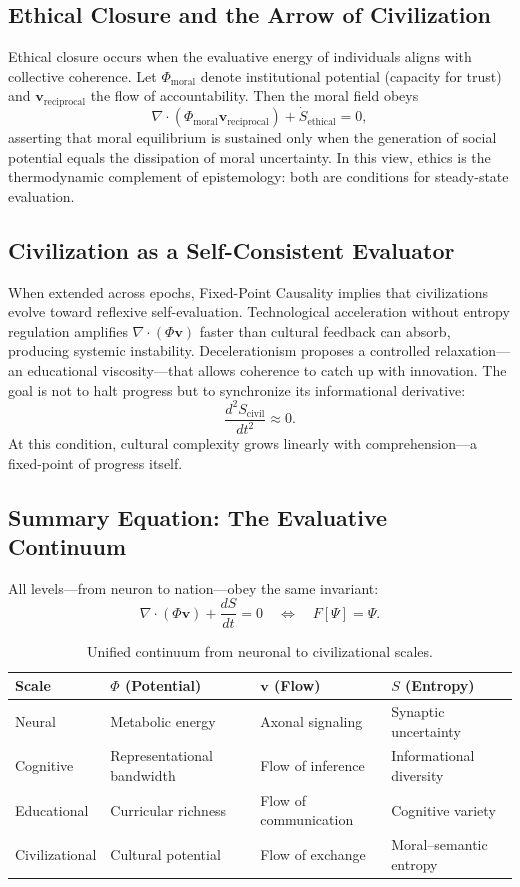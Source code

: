 \documentclass[12pt,a4paper]{article}
\begin{document}
\subsection{Ethical Closure and the Arrow of Civilization}

Ethical closure occurs when the evaluative energy of individuals aligns with collective coherence.
Let $\Phi_{\mathrm{moral}}$ denote institutional potential (capacity for trust) and $\mathbf{v}_{\mathrm{reciprocal}}$ the flow of accountability.
Then the moral field obeys
\[
\nabla\!\cdot(\Phi_{\mathrm{moral}}\mathbf{v}_{\mathrm{reciprocal}})+\dot S_{\mathrm{ethical}}=0,
\]
asserting that moral equilibrium is sustained only when the generation of social potential equals the dissipation of moral uncertainty.
In this view, ethics is the thermodynamic complement of epistemology: both are conditions for steady-state evaluation.

\subsection{Civilization as a Self-Consistent Evaluator}

When extended across epochs, Fixed-Point Causality implies that civilizations evolve toward reflexive self-evaluation.
Technological acceleration without entropy regulation amplifies $\nabla\!\cdot(\Phi\mathbf{v})$ faster than cultural feedback can absorb, producing systemic instability.
Decelerationism proposes a controlled relaxation—an educational viscosity—that allows coherence to catch up with innovation.
The goal is not to halt progress but to synchronize its informational derivative:
\[
\frac{d^2S_{\mathrm{civil}}}{dt^2}\approx0.
\]
At this condition, cultural complexity grows linearly with comprehension—a fixed-point of progress itself.

\subsection{Summary Equation: The Evaluative Continuum}

All levels—from neuron to nation—obey the same invariant:
\[
\nabla\!\cdot(\Phi\mathbf{v})+\frac{dS}{dt}=0
\quad\Longleftrightarrow\quad
F[\Psi]=\Psi.
\]
\begin{table}[h!]
\centering
\begin{tabular}{llll}
\toprule
\textbf{Scale} & $\Phi$ (Potential) & $\mathbf{v}$ (Flow) & $S$ (Entropy)\\
\midrule
Neural & Metabolic energy & Axonal signaling & Synaptic uncertainty\\
Cognitive & Representational bandwidth & Flow of inference & Informational diversity\\
Educational & Curricular richness & Flow of communication & Cognitive variety\\
Civilizational & Cultural potential & Flow of exchange & Moral–semantic entropy\\
\bottomrule
\end{tabular}
\caption{Unified continuum from neuronal to civilizational scales.}
\end{table}
\end{document}
